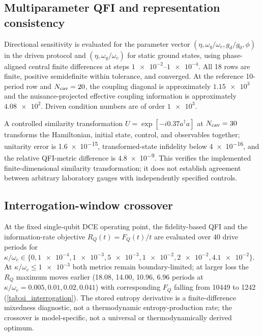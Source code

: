 \documentclass[aps,prxquantum,preprint,superscriptaddress,amsmath,amssymb]{revtex4-2}
\begin{document}
\subsection{Multiparameter QFI and representation consistency}
\label{sec:si_multiparameter}

Directional sensitivity is evaluated for the parameter vector $(\eta,\omega_q/\omega_c,g_d/g_0,\phi)$ in the driven protocol and $(\eta,\omega_q/\omega_c)$ for static ground states, using phase-aligned central finite differences at steps $\num{1e-2}$--$\num{1e-4}$. All \num{18} rows are finite, positive semidefinite within tolerance, and converged. At the reference \num{10}-period row and $N_{\rm cav}=\num{20}$, the coupling diagonal is approximately $\num{1.15e3}$ and the nuisance-projected effective coupling information is approximately $\num{4.08e2}$. Driven condition numbers are of order $\num{1e3}$.

A controlled similarity transformation $U=\exp[-i\num{0.37}a^\dagger a]$ at $N_{\rm cav}=\num{30}$ transforms the Hamiltonian, initial state, control, and observables together; unitarity error is \num{1.6e-15}, transformed-state infidelity below \num{4e-16}, and the relative QFI-metric difference is \num{4.8e-9}. This verifies the implemented finite-dimensional similarity transformation; it does not establish agreement between arbitrary laboratory gauges with independently specified controls.

\subsection{Interrogation-window crossover}
\label{sec:si_interrogation}

At the fixed single-qubit DCE operating point, the fidelity-based QFI and the information-rate objective $R_Q(t)=F_Q(t)/t$ are evaluated over \num{40} drive periods for $\kappa/\omega_c\in\{0,\num{1e-4},\num{1e-3},\num{5e-3},\num{1e-2},\num{2e-2},\num{4.1e-2}\}$. At $\kappa/\omega_c\le\num{1e-3}$ both metrics remain boundary-limited; at larger loss the $R_Q$ maximum moves earlier (\num{18.08}, \num{14.00}, \num{10.96}, \num{6.96} periods at $\kappa/\omega_c=\num{0.005},\num{0.01},\num{0.02},\num{0.041}$) with corresponding $F_Q$ falling from \num{10449} to \num{1242} (\cref{tab:si_interrogation}). The stored entropy derivative is a finite-difference mixedness diagnostic, not a thermodynamic entropy-production rate; the crossover is model-specific, not a universal or thermodynamically derived optimum.
\end{document}
